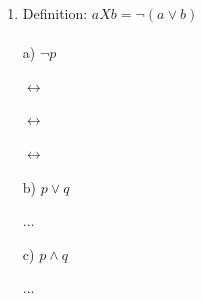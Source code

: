 \documentclass[12pt]{article}
\begin{document}
\begin{enumerate}

{\color{blue}
...

}










\newpage


\item       %
%
%
Definition:    $a X b = \neg ( a \lor  b)$\\\\
a) $\neg p$ \\

{\color{blue}
$\leftrightarrow$

$\leftrightarrow$

$\leftrightarrow$

}

\vskip1cm

b) $p\lor q$ \\

{\color{blue}
...

}

\vskip1cm

c) $p\land q$\\

{\color{blue}
...

}



\end{enumerate} 
\end{document}
